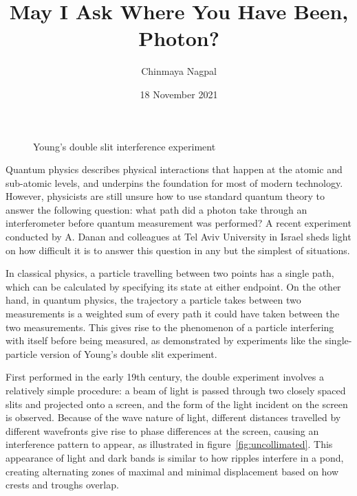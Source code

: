 \documentclass{article}
\author{Chinmaya Nagpal}
\title{May I Ask Where You Have Been, Photon?}
\date{18 November 2021}
\begin{document}
\maketitle

\begin{figure}[ht]
	\hspace*{\fill}
	\caption{Young's double slit interference experiment}
	\label{fig:double-slit}
\end{figure}

Quantum physics describes physical interactions that happen at the atomic and
sub-atomic levels, and underpins the foundation for most of modern technology.
However, physicists are still unsure how to use standard quantum theory to 
answer the following question: what path did a photon take through an 
interferometer before quantum measurement was performed?  A recent experiment 
conducted by A. Danan and colleagues at Tel Aviv University in Israel sheds 
light on how difficult it is to answer this question in any but the simplest of 
situations. 

In classical physics, a particle travelling between two points has a single
path, which can be calculated by specifying its state at either endpoint. On 
the other hand, in quantum physics, the trajectory a particle takes between two 
measurements is a weighted sum of every path it could have taken between the 
two measurements. This gives rise to the phenomenon of a particle interfering 
with itself before being measured, as demonstrated by experiments like the 
single-particle version of Young's double slit experiment. 

First performed in the early 19th century, the double experiment involves a 
relatively simple procedure: a beam of light is passed through two closely 
spaced slits and projected onto a screen, and the form of the light incident on 
the screen is observed. Because of the wave nature of light, different 
distances travelled by different wavefronts give rise to phase differences at 
the screen, causing an interference pattern to appear, as illustrated in 
figure~\ref{fig:uncollimated}. This appearance of light and dark bands is 
similar to how ripples interfere in a pond, creating alternating zones of 
maximal and minimal displacement based on how crests and troughs overlap.
\end{document}
